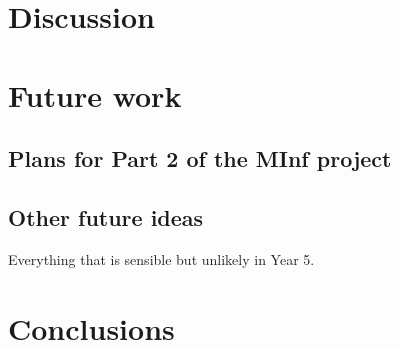 \documentclass[bsc,frontabs,twoside,singlespacing,parskip,deptreport]{infthesis}
\begin{document}
\chapter{Discussion}{
  
}

\chapter{Future work}{
  \section{Plans for Part 2 of the MInf project}{

  }

  \section{Other future ideas}{
    Everything that is sensible but unlikely in Year 5.
  }
}

\chapter{Conclusions}{
  
}



\end{document}
